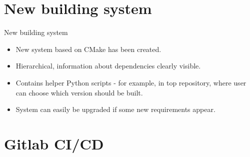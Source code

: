 \documentclass[10pt]{beamer}
\begin{document}
\section {New building system}

\begin{frame}{New building system}
\begin{itemize}
  \item New system based on CMake has been created.
  \item Hierarchical, information about dependencies clearly visible.
  \item Contains helper Python scripts - for example, in top repository, where user can choose which version should be built.
  \item System can easily be upgraded if some new requirements appear.
\end{itemize}
\end{frame}


\section {Gitlab CI/CD}
\end{document}
